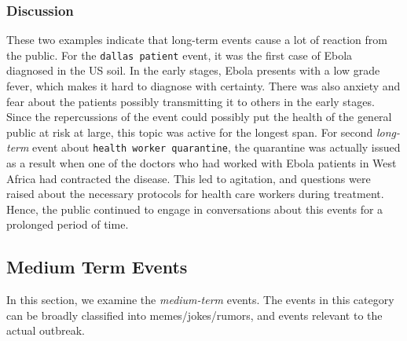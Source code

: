\subsubsection{Discussion}
These two examples indicate that long-term events cause a lot of reaction from the public.
For the \texttt{dallas patient} event, it was the first case of Ebola diagnosed
in the US soil.  
In the early stages, Ebola presents
with a low grade fever, which makes it hard to diagnose with certainty.
There was also anxiety and fear about the patients possibly transmitting it
to others in the early stages.  Since the repercussions of the event could possibly put
the health of the general public at risk at large, this topic
was active for the longest span.
For second \emph{long-term} event about \texttt{health worker quarantine},
the quarantine was actually issued as a result when one of the doctors who had
worked with Ebola patients in West Africa had contracted the disease.  
This led to agitation, and
questions were raised about the necessary 
protocols for health care workers during treatment. Hence,
the public continued to engage in conversations about this
events for a prolonged period of time.

\subsection{Medium Term Events}
In this section, we examine the \emph{medium-term} events.
The events in this category can be broadly classified
into memes/jokes/rumors, and events relevant to the actual outbreak.

